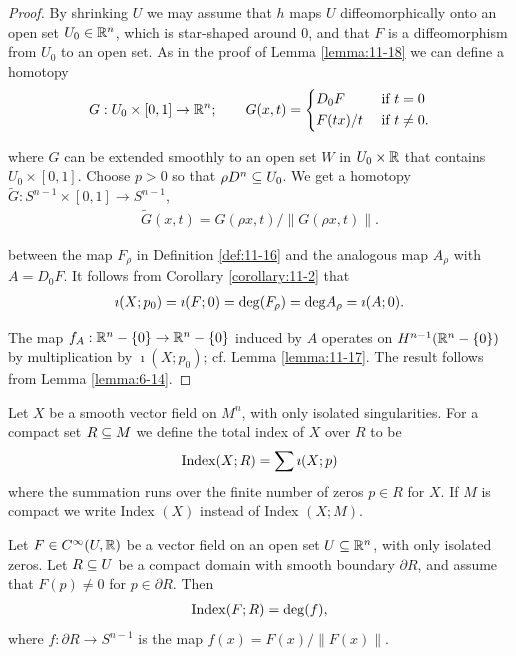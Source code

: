 \begin{proof}
  By shrinking $U$ we may assume that $h$ maps $U$ diffeomorphically onto an
open set $U_0\in\mathbb{R}^n$, which is star-shaped around 0, and that $F$ is a diffeomorphism
from $U_0$ to an open set. As in the proof of Lemma \ref{lemma:11-18} we can define a homotopy
\begin{align*}
  G:U_0\times[0, 1]\to\mathbb{R}^n; \qquad G(x, t) = \left\{\begin{aligned}
    & D_0F   && \text{ if } t = 0 \\
    & F(tx)/t && \text{ if } t\neq 0.
  \end{aligned}\right.
\end{align*}

where $G$ can be extended smoothly to an open set $W$ in $U_0\times \mathbb{R}$ that contains
$U_0\times [0,1]$. Choose $p > 0$ so that $\rho D^n\subseteq U_0$. We get a homotopy $\tilde{G}:
S^{n-1}\times[0, 1]\to S^{n-1}$,
\begin{align*}
  \tilde{G}(x, t) = G(\rho x, t)\big/ \|G(\rho x, t)\|.
\end{align*}

between the map $F_\rho$ in Definition \ref{def:11-16} and the analogous map $A_\rho$ with $A=D_0F$.
It follows from Corollary \ref{corollary:11-2} that
\begin{align*}
  \imath(X; p_0) = \imath(F; 0) 
  = \mathrm{deg}(F_\rho) = \mathrm{deg}A_\rho  
  = \imath(A; 0).
\end{align*}

The map $f_A:\mathbb{R}^n-\{0\}\to \mathbb{R}^n-\{0\}$ induced by $A$ operates on $H^{n-1}(\mathbb{R}^n-\{0\})$ by 
multiplication by $\imath(X; p_0)$; cf. Lemma \ref{lemma:11-17}. The result follows from 
Lemma \ref{lemma:6-14}.
\end{proof}

\begin{definition}\label{def:11-21}
  Let $X$ be a smooth vector field on $M^n$, with only isolated
  singularities. For a compact set $R\subseteq M$ we define the total index of $X$ over
  $R$ to be
  \begin{align*}
    \mathrm{Index}(X; R) = \sum \imath(X; p)
  \end{align*}
  where the summation runs over the finite number of zeros $p\in R$ for $X$. If $M$ is
  compact we write Index $(X)$ instead of Index $(X; M)$.
\end{definition}

\begin{theorem}\label{theorem:11-22}
  Let $F\in C^\infty(U, \mathbb{R})$ be a vector field on an open set $U\subseteq\mathbb{R}^n$,
with only isolated zeros. Let $R\subseteq U$ be a compact domain with smooth boundary
$\partial R$, and assume that $F(p)\neq 0$ for $p\in\partial R$. Then
\begin{align*}
  \mathrm{Index}(F; R) = \mathrm{deg}(f),
\end{align*}
where $f:\partial R\to S^{n-1}$ is the map $f(x) = F(x)/\|F(x)\|$.
\end{theorem}

